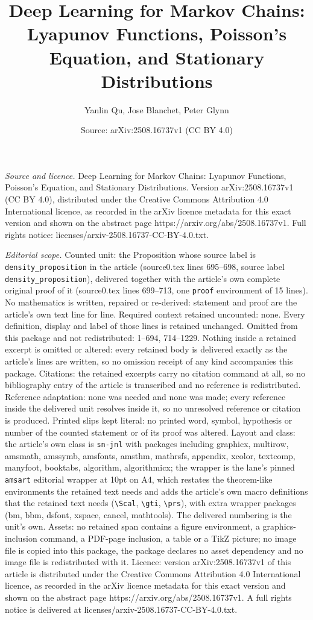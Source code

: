 \documentclass[10pt,a4paper]{amsart}
\title[Deep Learning for Markov Chains: Lyapunov Functions, Poisson]{Deep Learning for Markov Chains: Lyapunov Functions, Poisson's Equation, and Stationary Distributions}
\author{Yanlin Qu, Jose Blanchet, Peter Glynn}
\date{Source: arXiv:2508.16737v1 (CC BY 4.0)}
\begin{document}
\maketitle

\noindent\emph{Source and licence.} Deep Learning for Markov Chains: Lyapunov Functions, Poisson's Equation, and Stationary Distributions. Version arXiv:2508.16737v1 (CC BY 4.0), distributed under the Creative Commons Attribution 4.0 International licence, as recorded in the arXiv licence metadata for this exact version and shown on the abstract page https://arxiv.org/abs/2508.16737v1. Full rights notice: licenses/arxiv-2508.16737-CC-BY-4.0.txt.\par\smallskip

\noindent\textit{Editorial scope.} Counted unit: the Proposition whose source label is \texttt{density\_proposition} in the article (source0.tex lines 695--698, source label \texttt{density\_proposition}), delivered together with the article's own complete original proof of it (source0.tex lines 699--713, one \texttt{proof} environment of 15 lines). No mathematics is written, repaired or re-derived: statement and proof are the article's own text line for line. Required context retained uncounted: none. Every definition, display and label of those lines is retained unchanged. Omitted from this package and not redistributed: 1--694, 714--1229. Nothing inside a retained excerpt is omitted or altered: every retained body is delivered exactly as the article's lines are written, so no omission receipt of any kind accompanies this package. Citations: the retained excerpts carry no citation command at all, so no bibliography entry of the article is transcribed and no reference is redistributed. Reference adaptation: none was needed and none was made; every reference inside the delivered unit resolves inside it, so no unresolved reference or citation is produced. Printed slips kept literal: no printed word, symbol, hypothesis or number of the counted statement or of its proof was altered. Layout and class: the article's own class is \texttt{sn-jnl} with packages including graphicx, multirow, amsmath, amssymb, amsfonts, amsthm, mathrsfs, appendix, xcolor, textcomp, manyfoot, booktabs, algorithm, algorithmicx; the wrapper is the lane's pinned \texttt{amsart} editorial wrapper at 10pt on A4, which restates the theorem-like environments the retained text needs and adds the article's own macro definitions that the retained text needs (\texttt{\textbackslash Scal}, \texttt{\textbackslash gti}, \texttt{\textbackslash prs}), with extra wrapper packages (bm, bbm, dsfont, xspace, cancel, mathtools). The delivered numbering is the unit's own. Assets: no retained span contains a figure environment, a graphics-inclusion command, a PDF-page inclusion, a table or a TikZ picture; no image file is copied into this package, the package declares no asset dependency and no image file is redistributed with it. Licence: version arXiv:2508.16737v1 of this article is distributed under the Creative Commons Attribution 4.0 International licence, as recorded in the arXiv licence metadata for this exact version and shown on the abstract page https://arxiv.org/abs/2508.16737v1. A full rights notice is delivered at licenses/arxiv-2508.16737-CC-BY-4.0.txt. 
\end{document}
